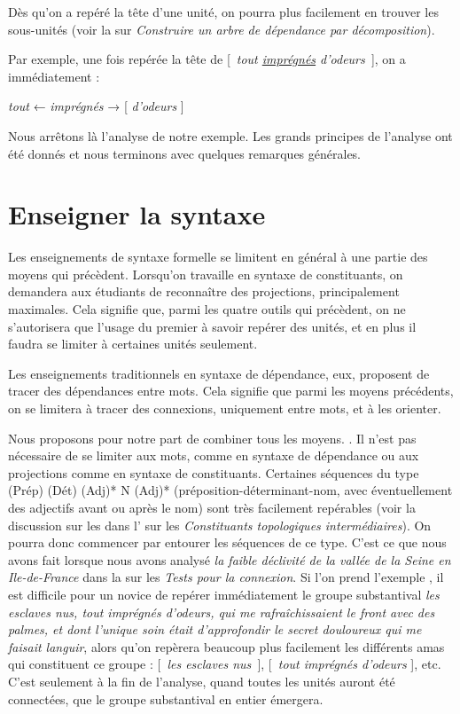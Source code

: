 \begin{tblsframed}{}
\noindent Dès qu’on a repéré la tête d’une unité, on pourra plus facilement en trouver les sous-unités (voir la  sur \textit{Construire un arbre de dépendance par décomposition}).
\end{tblsframed}

Par exemple, une fois repérée la tête de [~\textit{tout \uline{imprégnés} d’odeurs~}], on a immédiatement :

\ea
{\textit{tout}} ← \textit{imprégnés} → [ \textit{d’odeurs} ]
\z

Nous arrêtons là l’analyse de notre exemple. Les grands principes de l’analyse ont été donnés et nous terminons avec quelques remarques générales.

\section{Enseigner la syntaxe}\label{sec:3.4.28}

Les enseignements de syntaxe formelle se limitent en général à une partie des moyens qui précèdent. Lorsqu’on travaille en syntaxe de constituants, on demandera aux étudiants de reconnaître des projections, principalement maximales. Cela signifie que, parmi les quatre outils qui précèdent, on ne s’autorisera que l’usage du premier à savoir repérer des unités, et en plus il faudra se limiter à certaines unités seulement.

Les enseignements traditionnels en syntaxe de dépendance, eux, proposent de tracer des dépendances entre mots. Cela signifie que parmi les moyens précédents, on se limitera à tracer des connexions, uniquement entre mots, et à les orienter.

Nous proposons pour notre part de combiner tous les moyens. . Il n’est pas nécessaire de se limiter aux mots, comme en syntaxe de dépendance ou aux projections comme en syntaxe de constituants. Certaines séquences du type (Prép) (Dét) (Adj)* N (Adj)* (préposition-déterminant-nom, avec éventuellement des adjectifs avant ou après le nom) sont très facilement repérables (voir la discussion sur les  dans l' sur les \textit{Constituants topologiques intermédiaires}). On pourra donc commencer par entourer les séquences de ce type. C’est ce que nous avons fait lorsque nous avons analysé \textit{la faible déclivité de la vallée de la Seine en Ile-de-France} dans la  sur les \textit{Tests pour la connexion}. Si l’on prend l'exemple , il est difficile pour un novice de repérer immédiatement le groupe substantival \textit{les esclaves nus, tout imprégnés d’odeurs, qui me rafraîchissaient le front avec des palmes, et dont l’unique soin était d’approfondir le secret douloureux qui me faisait languir}, alors qu’on repèrera beaucoup plus facilement les différents amas qui constituent ce groupe : [~\textit{les esclaves nus~}], [~\textit{tout imprégnés d’odeurs} ], etc. C’est seulement à la fin de l’analyse, quand toutes les unités auront été connectées, que le groupe substantival en entier émergera.

